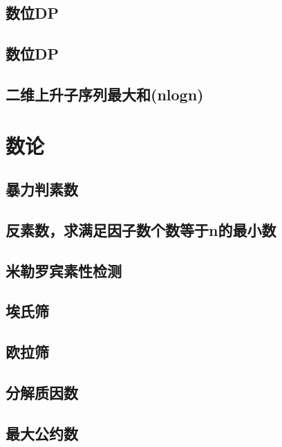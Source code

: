 \section{数位DP}
\raggedbottom
\hrulefill
\section{数位DP}
\raggedbottom
\hrulefill
\section{二维上升子序列最大和(nlogn)}
\raggedbottom
\hrulefill

\chapter{数论}
\section{暴力判素数}
\raggedbottom
\hrulefill
\section{反素数，求满足因子数个数等于n的最小数}
\raggedbottom
\hrulefill
\section{米勒罗宾素性检测}
\raggedbottom
\hrulefill
\section{埃氏筛}
\raggedbottom
\hrulefill
\section{欧拉筛}
\raggedbottom
\hrulefill
\section{分解质因数}
\raggedbottom
\hrulefill
\section{最大公约数}
\raggedbottom
\hrulefill
